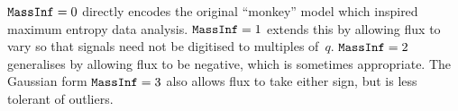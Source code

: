 \centerline{\vbox{\vskip 4pt
\offinterlineskip
       } }
\noindent ${\tt MassInf}=0$ directly encodes the original ``monkey'' model which inspired maximum entropy data analysis.  
${\tt MassInf}=1$ extends this by allowing flux to vary so that signals need not be digitised to multiples of~$q$.  
${\tt MassInf}=2$ generalises by allowing flux to be negative, which is sometimes appropriate.  
The Gaussian form ${\tt MassInf}=3$ also allows flux to take either sign, but is less tolerant of outliers.

